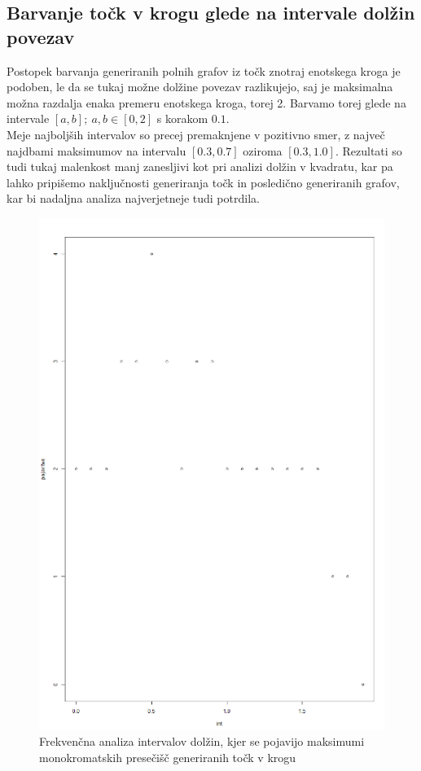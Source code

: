 \documentclass[12pt, a4paper]{article}
\begin{document}
	\subsection{Barvanje točk v krogu glede na intervale dolžin povezav}
	Postopek barvanja generiranih polnih grafov iz točk znotraj enotskega kroga je podoben, le da se tukaj možne dolžine povezav razlikujejo, saj je maksimalna možna razdalja enaka premeru enotskega kroga, torej 2. Barvamo torej glede na intervale $\left[{a,b}\right]; \ a,b \in \left[{0,2}\right]$ s korakom $0.1$. \\
	Meje najboljših  intervalov so precej premaknjene v pozitivno smer, z največ najdbami maksimumov na intervalu $\left[{0.3, 0.7}\right]$ oziroma $\left[{0.3, 1.0}\right]$. Rezultati so tudi tukaj malenkost manj zanesljivi kot pri analizi dolžin v kvadratu, kar pa lahko pripišemo naključnosti generiranja točk in posledično generiranih grafov, kar bi nadaljna analiza najverjetneje tudi potrdila.
	\begin{figure}[h!]
		\caption{Frekvenčna analiza intervalov dolžin, kjer se pojavijo maksimumi monokromatskih presečišč generiranih točk v krogu}
		\includegraphics[scale=0.6]{frekvencni_krog_dolzin}
		\centering
	\end{figure}
\end{document}
